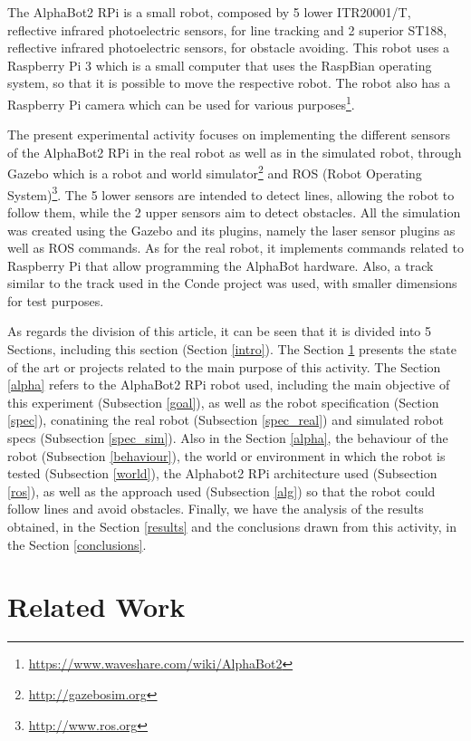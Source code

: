 \documentclass[conference]{IEEEtran}
\begin{document}
The AlphaBot2 RPi is a small robot, composed by 5 lower ITR20001/T, reflective infrared photoelectric sensors, for line tracking and 2 superior ST188, reflective infrared photoelectric sensors, for obstacle avoiding. This robot uses a Raspberry Pi 3 which is a small computer that uses the RaspBian operating system, so that it is possible to move the respective robot. The robot also has a Raspberry Pi camera which can be used for various purposes\footnote{\url{https://www.waveshare.com/wiki/AlphaBot2}}.

The present experimental activity focuses on implementing the different sensors of the AlphaBot2 RPi in the real robot as well as in the simulated robot, through Gazebo which is a robot and world simulator\footnote{\url{http://gazebosim.org}} and ROS (Robot Operating System)\footnote{\url{http://www.ros.org}}. The 5 lower sensors are intended to detect lines, allowing the robot to follow them, while the 2 upper sensors aim to detect obstacles. All the simulation was created using the Gazebo and its plugins, namely the laser sensor plugins as well as ROS commands. As for the real robot, it implements commands related to Raspberry Pi that allow programming the AlphaBot hardware. Also, a track similar to the track used in the Conde project\cite{b1, b2, b3} was used, with smaller dimensions for test purposes.

As regards the division of this article, it can be seen that it is divided into 5 Sections, including this section (Section \ref{intro}). The Section \ref{relwork} presents the state of the art or projects related to the main purpose of this activity. The Section \ref{alpha} refers to the AlphaBot2 RPi robot used, including the main objective of this experiment (Subsection \ref{goal}), as well as the robot specification (Section \ref{spec}), conatining the real robot (Subsection \ref{spec_real}) and simulated robot specs (Subsection \ref{spec_sim}). Also in the Section \ref{alpha}, the behaviour of the robot (Subsection \ref{behaviour}), the world or environment in which the robot is tested (Subsection \ref{world}), the Alphabot2 RPi architecture used (Subsection \ref{ros}), as well as the approach used (Subsection \ref{alg}) so that the robot could follow lines and avoid obstacles. Finally, we have the analysis of the results obtained, in the Section \ref{results} and the conclusions drawn from this activity, in the Section \ref{conclusions}.

\section{Related Work} \label{relwork}
\end{document}
